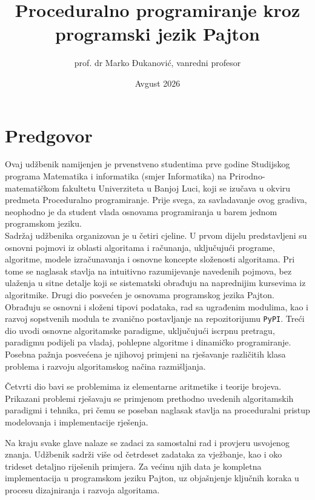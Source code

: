 \documentclass[b5paper, utf8, 11pt, colorlinks]{book}
\begin{document}
\author{prof. dr Marko Đukanović, vanredni profesor}
\title{Proceduralno programiranje kroz programski jezik Pajton}
\date{Avgust 2026}

 
\maketitle
 
\tableofcontents
 \clearpage
 \setcounter{page}{1}

\chapter*{Predgovor}

Ovaj udžbenik namijenjen je prvenstveno studentima prve godine Studijskog programa Matematika i informatika (smjer Informatika) na Prirodno-matematičkom fakultetu Univerziteta u Banjoj Luci, koji se izučava u okviru predmeta Proceduralno programiranje. Prije svega, za savladavanje ovog gradiva,  neophodno je da student vlada  osnovama programiranja u barem jednom programskom jeziku.  \\ 


Sadržaj udžbenika organizovan je u četiri cjeline. U prvom dijelu predstavljeni su osnovni pojmovi iz oblasti algoritama i računanja, uključujući programe, algoritme, modele izračunavanja i osnovne koncepte složenosti algoritama. Pri tome se naglasak stavlja na intuitivno razumijevanje navedenih pojmova, bez ulaženja u sitne detalje koji se sistematski obrađuju na naprednijim kursevima iz algoritmike. Drugi dio posvećen je osnovama programskog jezika Pajton. Obrađuju se osnovni i složeni tipovi podataka, rad sa ugrađenim modulima, kao i razvoj sopstvenih modula te zvanično postavljanje na repozitorijumu \texttt{PyPI}.  Treći dio uvodi osnovne algoritamske paradigme, uključujući iscrpnu pretragu, paradigmu podijeli pa vladaj, pohlepne algoritme i dinamičko programiranje. Posebna pažnja posvećena je njihovoj primjeni na rješavanje različitih klasa problema i razvoju algoritamskog načina razmišljanja.

Četvrti dio bavi se problemima iz elementarne aritmetike i teorije brojeva. Prikazani problemi rješavaju se primjenom prethodno uvedenih algoritamskih paradigmi i tehnika, pri čemu se poseban naglasak stavlja na proceduralni pristup modelovanja i implementacije rješenja.

Na kraju svake glave nalaze se zadaci za samostalni rad i provjeru usvojenog znanja. Udžbenik sadrži više od četrdeset zadataka za vježbanje, kao i oko trideset detaljno riješenih primjera. Za većinu njih data je kompletna implementacija u programskom jeziku Pajton, uz objašnjenje ključnih koraka u procesu dizajniranja i razvoja algoritama.\\
\end{document}
